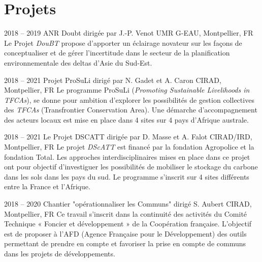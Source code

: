 \documentclass[]{cv-etienne}
\begin{document}
\section{Projets}
\begin{entrylist}
\entry
{2018 -- 2019}
{ANR Doubt {\normalfont dirigée par J.-P. Venot}}
{UMR G-EAU, Montpellier, FR}
{Le Projet \emph{DouBT} propose d'apporter un éclairage novateur sur les façons de conceptualiser et de gérer l'incertitude dans le secteur de la planification environnementale des deltas d'Asie du Sud-Est.}
\end{entrylist}
\begin{entrylist}
\entry
{2018 -- 2021}
{Projet ProSuLi {\normalfont dirigé par N. Gadet et A. Caron}}
{CIRAD, Montpellier, FR}
{Le programme ProSuLi (\emph{Promoting Sustainable Livelihoods in TFCAs}), se donne pour ambition d'explorer les possibilités de gestion collectives des \emph{TFCAs} (Transfrontier Conservation Area). Une démarche d'accompagnement des acteurs locaux est mise en place dans 4 sites sur 4 pays d'Afrique australe.}
\end{entrylist}
\begin{entrylist}
\entry
{2018 -- 2021}
{Le Projet DSCATT {\normalfont dirigée par D. Masse et A. Falot}}
{CIRAD/IRD, Montpellier, FR}
{Le projet \emph{DScATT} est financé par la fondation Agropolice et la fondation Total. Les approches interdisciplinaires mises en place dans ce projet ont pour objectif d'investiguer les possibilités de mobiliser le stockage du carbone dans les sols dans les pays du sud. Le programme s'inscrit sur 4 sites différents entre la France et l'Afrique.}
\end{entrylist}
\begin{entrylist}
\entry
{2018 -- 2020}
{Chantier "opérationnaliser les Communs" {\normalfont dirigé S. Aubert}}
{CIRAD, Montpellier, FR}
{Ce travail s'inscrit dans la continuité des activités du Comité Technique « Foncier et développement » de la Coopération française. L'objectif est de proposer à l'AFD (Agence Française pour le Développement) des outils permettant de prendre en compte et favoriser la prise en compte de communs dans les projets de développements.}
\end{entrylist}
\end{document}
